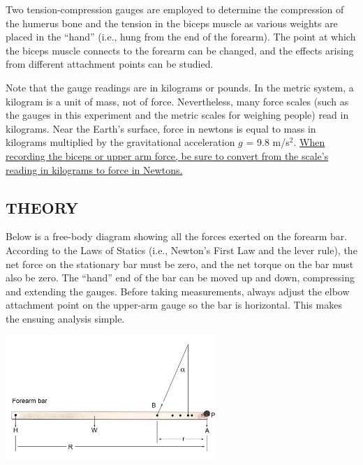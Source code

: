 Two tension-compression gauges are employed to determine the compression of the humerus bone and the tension in the biceps muscle as various weights are placed in the ``hand'' (i.e., hung from the end of the forearm).  The point at which the biceps muscle connects to the forearm can be changed, and the effects arising from different attachment points can be studied.

Note that the gauge readings are in kilograms or pounds.  In the metric system, a kilogram is a unit of mass, not of force.  Nevertheless, many force scales (such as the gauges in this experiment and the metric scales for weighing people) read in kilograms.  Near the Earth's surface, force in newtons is equal to mass in kilograms multiplied by the gravitational acceleration \(g\) = 9.8 m/s\(^{2}\).  
\ul{When recording the biceps or upper arm force, 
be sure to convert from the scale's
reading in kilograms to force in Newtons.}

\subsection*{THEORY}

Below is a free-body diagram showing all the forces exerted on the forearm bar.  According to the Laws of Statics (i.e., Newton's First Law and the lever rule), the net force on the stationary bar must be zero, and the net torque on the bar must also be zero.  The ``hand'' end of the bar can be moved up and down, compressing and extending the gauges.  Before taking measurements, always adjust the elbow attachment point on the upper-arm gauge so the bar is horizontal.  This makes the ensuing analysis simple.
\begin{center} \includegraphics*[width=0.6\textwidth]{imgs/6labs/6Alab/6Aexp6/6A_6_arm.jpg} \end{center}

